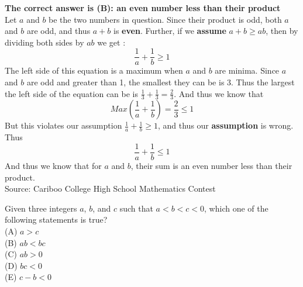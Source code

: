\documentclass{article}
\begin{document}
\textbf{The correct answer is (B): an even number less than their product}\\[1 ex]
Let $a$ and $b$ be the two numbers in question. Since their product is odd, both $a$ and $b$ are odd, and thus $a+b$ is \textbf{even}. Further, if we \textbf{assume} $a+b\geq ab$, then by dividing both sides by $ab$ we get :
\begin{equation*}
\frac{1}{a}+\frac{1}{b}\geq 1
\end{equation*}
The left side of this equation is a maximum when $a$ and $b$ are minima.  Since $a$ and $b$ are odd and greater than 1, the smallest they can be is 3.  Thus the largest the left side of the equation can be is $\frac{1}{3}+\frac{1}{3}=\frac{2}{3}$. And thus we know that
\begin{equation*}
Max(\frac{1}{a}+\frac{1}{b})=\frac{2}{3}\leq 1
\end{equation*}
But this violates our assumption $\frac{1}{a}+\frac{1}{b}\geq 1$, and thus our \textbf{assumption} is wrong.  Thus \begin{equation*}
\frac{1}{a}+\frac{1}{b}\leq 1
\end{equation*}
And thus we know that for $a$ and $b$, their sum is an even number less than their product.
\\[5 ex]

\scriptsize
Source: Cariboo College High School Mathematics Contest

\normalsize
Given three integers $a$, $b$, and $c$ such that $a<b<c<0$, which one of the following statements is true?\\
(A) $a>c$\\
(B) $ab<bc$\\
(C) $ab>0$\\
(D) $bc<0$\\
(E) $c-b<0$\\

\end{document}
